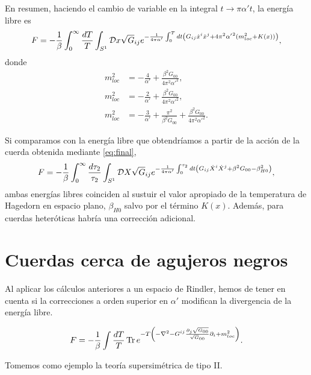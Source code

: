 En resumen, haciendo el cambio de variable en la integral $t\to\pi \alpha't$, la energía libre es
\begin{equation}
  F=-\frac{1}{\beta}\int_0^\infty \frac{dT}{T} \int_{S^1} \mathcal D x\sqrt G_{ij}  e^{ -\frac{1}{4\pi\alpha'}\int_0^T dt \qty(  
  G_{ij}\dot x^i \dot x^j  + 4\pi^2{\alpha'}^2 (m_{loc}^2+K(x)))},
\end{equation}
donde
\begin{equation}
  \begin{aligned}
    m_{loc}^2 &= -\frac{4}{\alpha'}+\frac{\beta^2G_{00}}{4\pi^2 \alpha'^2},\\
    m_{loc}^2 &= -\frac{2}{\alpha'}+\frac{\beta^2G_{00}}{4\pi^2 \alpha'^2},\\
    m_{loc}^2 &= -\frac{3}{\alpha'}+\frac{\pi^2}{\beta^2 G_{00}}+\frac{\beta^2G_{00}}{4\pi^2 \alpha'^2}.
  \end{aligned}
\end{equation}

Si comparamos con la energía libre que obtendríamos a partir de la acción de la cuerda obtenida
mediante \ref{eq:final},
\begin{equation}
  F=-\frac{1}{\beta} \int_0^\infty \frac{d\tau_2}{\tau_2} \int_{S^1} \mathcal D X\sqrt G_{ij}  e^{ -\frac{1}{4\pi\alpha'}\int_0^{\tau_2} dt \qty(  
  G_{ij}\dot X^i \dot X^j  + \beta^2 G_{00} - \beta^2_{H0})},
\end{equation}
ambas energías libres coinciden al sustuir el valor apropiado de la temperatura de Hagedorn
en espacio plano, $\beta_{H0}$ salvo por el término $K(x)$.
Además, para cuerdas heteróticas habría una corrección adicional.




\section{Cuerdas cerca de agujeros negros}

Al aplicar los cálculos anteriores a un espacio de Rindler, hemos de tener en cuenta si la
correcciones a orden superior en $\alpha'$ modifican la divergencia de la energía libre.

\begin{equation}
  F=-\frac{1}{\beta}\int \frac{dT}{T} \Tr e^{-T\qty(  -\nabla^2-G^{ij}\frac{\partial_j \sqrt{G_{00}}}{\sqrt G_{00}}\partial_i + m^2_{loc}) }.
\end{equation}

Tomemos como ejemplo la teoría supersimétrica de tipo II.

